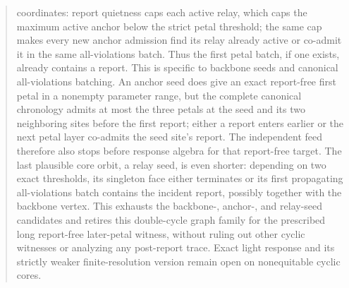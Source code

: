 \documentclass[11pt]{article}
\begin{document}
\begin{abstract}
coordinates: report quietness caps each active relay, which caps the maximum
active anchor below the strict petal threshold; the same cap makes every new
anchor admission find its relay already active or co-admit it in the same
all-violations batch.  Thus the first petal batch, if one exists, already
contains a report.  This is specific to backbone seeds and canonical
all-violations batching.  An anchor seed does give an exact report-free first
petal in a nonempty parameter range, but the complete canonical chronology
admits at most the three petals at the seed and its two neighboring sites
before the first report; either a report enters earlier or the next petal
layer co-admits the seed site's report.  The independent feed therefore also
stops before response algebra for that report-free target.  The last plausible
core orbit, a relay seed, is even shorter: depending on two exact thresholds,
its singleton face either terminates or its first propagating all-violations
batch contains the incident report, possibly together with the backbone
vertex.  This exhausts the backbone-, anchor-, and relay-seed candidates and
retires this double-cycle graph family for the prescribed long report-free
later-petal witness, without ruling out other cyclic witnesses or analyzing
any post-report trace.
Exact light response and its strictly weaker finite-resolution version remain
open on nonequitable cyclic cores.
\end{abstract}

\tableofcontents






































\end{document}
